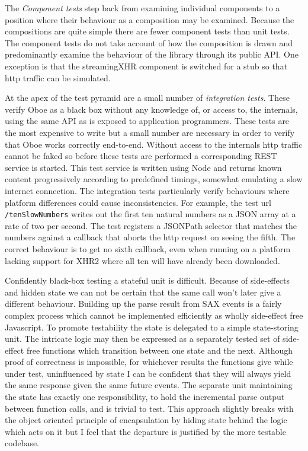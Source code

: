 \documentclass[12pt, ]{article}
\begin{document}
The \emph{Component tests} step back from examining individual
components to a position where their behaviour as a composition may be
examined. Because the compositions are quite simple there are fewer
component tests than unit tests. The component tests do not take account
of how the composition is drawn and predominantly examine the behaviour
of the library through its public API. One exception is that the
streamingXHR component is switched for a stub so that http traffic can
be simulated.

At the apex of the test pyramid are a small number of \emph{integration
tests}. These verify Oboe as a black box without any knowledge of, or
access to, the internals, using the same API as is exposed to
application programmers. These tests are the most expensive to write but
a small number are necessary in order to verify that Oboe works
correctly end-to-end. Without access to the internals http traffic
cannot be faked so before these tests are performed a corresponding REST
service is started. This test service is written using Node and returns
known content progressively according to predefined timings, somewhat
emulating a slow internet connection. The integration tests particularly
verify behaviours where platform differences could cause
inconsistencies. For example, the test url \texttt{/tenSlowNumbers}
writes out the first ten natural numbers as a JSON array at a rate of
two per second. The test registers a JSONPath selector that matches the
numbers against a callback that aborts the http request on seeing the
fifth. The correct behaviour is to get no sixth callback, even when
running on a platform lacking support for XHR2 where all ten will have
already been downloaded.

Confidently black-box testing a stateful unit is difficult. Because of
side-effects and hidden state we can not be certain that the same call
won't later give a different behaviour. Building up the parse result
from SAX events is a fairly complex process which cannot be implemented
efficiently as wholly side-effect free Javascript. To promote
testability the state is delegated to a simple state-storing unit. The
intricate logic may then be expressed as a separately tested set of
side-effect free functions which transition between one state and the
next. Although proof of correctness is impossible, for whichever results
the functions give while under test, uninfluenced by state I can be
confident that they will always yield the same response given the same
future events. The separate unit maintaining the state has exactly one
responsibility, to hold the incremental parse output between function
calls, and is trivial to test. This approach slightly breaks with the
object oriented principle of encapsulation by hiding state behind the
logic which acts on it but I feel that the departure is justified by the
more testable codebase.
\end{document}
